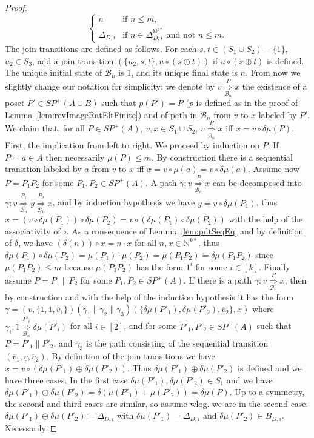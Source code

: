 \documentclass{CSML}
\begin{document}
\begin{proof}
$$\begin{cases}
  n & \text{if }n\leq m,\\
  \Delta_{D,i} & \text{if }n\in\Delta_{D,i}^{\mathbb{N}^{k*}}\text{ and not }n\leq m.
\end{cases}$$
 The join transitions are defined as follows. For each $s,t\in (S_1\cup S_2)-\{1\}$, $\overline{u}_2\in S_3$, add a join transition $(\{\overline{u}_2,s,t\},u\circ(s\oplus t))$ if $u\circ(s\oplus t)$ is defined. The unique initial state of $\mathcal{B}_n$ is $1$, and its unique final state is $n$.
 From now we slightly change our notation for simplicity: we denote by $v\mathop{\Longrightarrow}\limits_{\mathcal{B}_n}^{P} x$ the existence of a poset $P'\in SP^+(A\cup B)$ such that $p(P')=P$ ($p$ is defined as in the proof of Lemma~\ref{lem:revImageRatEltFinite}) and of path in $\mathcal{B}_n$ from $v$ to $x$ labeled by $P'$. 
We claim that, for all $P\in SP^+(A)$, $v,x\in S_1\cup S_2$,  $v\mathop{\Longrightarrow}\limits_{\mathcal{B}_n}^{P} x$ iff $x=v\circ\delta\mu (P)$. First, the implication from left to right. We proceed by induction on $P$. If $P=a\in A$ then necessarily $\mu(P)\leq m$. By construction there is a sequential transition labeled by $a$ from $v$ to $x$ iff $x=v\circ\mu(a)=v\circ\delta\mu(a)$. Assume now $P=P_1P_2$ for some $P_1,P_2\in SP^+(A)$. A path $\gamma:v\mathop{\Longrightarrow}\limits_{\mathcal{B}_n}^{P} x$ can be decomposed into $\gamma:v\mathop{\Longrightarrow}\limits_{\mathcal{B}_n}^{P_1} y\mathop{\Longrightarrow}\limits_{\mathcal{B}_n}^{P_2} x$, and by induction hypothesis we have $y=v\circ\delta\mu(P_1)$, thus $x=(v\circ\delta\mu(P_1))\circ\delta\mu(P_2)=v\circ(\delta\mu(P_1)\circ\delta\mu(P_2))$ with the help of the associativity of $\circ$. As a consequence of Lemma~\ref{lem:pdtSeqEq} and by definition of $\delta$, we have $(\delta (n))\circ x=n\cdot x$ for all $n,x\in\mathbb{N}^{k*}$, thus $\delta\mu(P_1)\circ\delta\mu(P_2)=\mu(P_1)\cdot\mu(P_2)=\mu(P_1P_2)=\delta\mu(P_1P_2)$ since $\mu(P_1P_2)\leq m$ because $\mu(P_1P_2)$ has the form $1^i$ for some $i\in[k]$. Finally assume $P=P_1\parallel P_2$ for some $P_1,P_2\in SP^+(A)$. If there is a path $\gamma:v\mathop{\Longrightarrow}\limits_{\mathcal{B}_n}^{P} x$, then by construction and with the help of the induction hypothesis it has the form $\gamma=(v,\{1,1,\overline{v}_1\})(\gamma_1\parallel\gamma_2\parallel\gamma_3)(\{\delta\mu(P'_1),\delta\mu(P'_2),\overline{v}_2\},x)$ where $\gamma_i:1\mathop{\Longrightarrow}\limits_{\mathcal{B}_n}^{P'_i}\delta\mu(P'_i)$ for all $i\in[2]$, and for some $P'_1,P'_2\in SP^+(A)$ such that $P=P'_1\parallel P'_2$, and $\gamma_3$ is the path consisting of the sequential transition $(\overline{v}_1,\underline{v},\overline{v}_2)$. By definition of the join transitions we have $x=v\circ(\delta\mu(P'_1)\oplus\delta\mu(P'_2))$. Thus $\delta\mu(P'_1)\oplus\delta\mu(P'_2)$ is defined and we have three cases. In the first case $\delta\mu(P'_1),\delta\mu(P'_2)\in S_1$ and we have $\delta\mu(P'_1)\oplus\delta\mu(P'_2)=\delta(\mu(P'_1)+\mu(P'_2))=\delta\mu(P)$. Up to a symmetry, the second and third cases are similar, so assume wlog. we are in the second case: $\delta\mu(P'_1)\oplus\delta\mu(P'_2)=\Delta_{D,i}$ with $\delta\mu(P'_1)=\Delta_{D,i}$ and $\delta\mu(P'_2)\in B_{D,i}$. Necessarily 
\end{proof}
\end{document}
